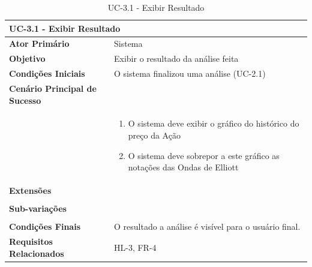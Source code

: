 \documentclass[12pt]{article}
\begin{document}
\begin{table}[H]
	\caption{UC-3.1 - Exibir Resultado}
	\label{tab:UC-3.1}
	\begin{tabular}{p{6cm} p{8cm}}
		\multicolumn{2}{l}{\large{\textbf{UC-3.1 - Exibir Resultado}}}\\
		\toprule
		\textbf{Ator Primário}		&	Sistema \\
		\midrule
		\textbf{Objetivo}			&	Exibir o resultado da análise feita \\
		\midrule
		\textbf{Condições Iniciais}	&	O sistema finalizou uma análise (UC-2.1) \\
		\midrule
		\textbf{Cenário Principal de Sucesso}	& \\
		& \begin{enumerate}
			\item O sistema deve exibir o gráfico do histórico do preço da Ação
			\item O sistema deve sobrepor a este gráfico as notações das Ondas de Elliott
		\end{enumerate}\\
		\midrule
		\textbf{Extensões}	& \\
		& \\
		\midrule
		\textbf{Sub-variações} & \\
		& \\
		\midrule
		\textbf{Condições Finais} & O resultado a análise é visível para o usuário final. \\
		\midrule
		\textbf{Requisitos Relacionados} & HL-3, FR-4 \\
		\bottomrule
	\end{tabular}		
\end{table}
\end{document}
